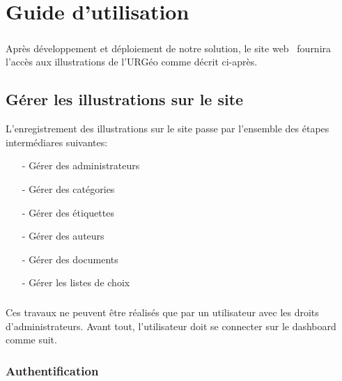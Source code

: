 \chapter{Guide d'utilisation}
	\paragraph{} Apr\`es d\'eveloppement et d\'eploiement de notre solution, le site web \projectName\ fournira l'acc\`es aux illustrations de l'URG\'eo comme d\'ecrit ci-apr\`es. 
	
	\section{G\'erer les illustrations sur le site}
	 L'enregistrement des illustrations sur le site passe par l'ensemble des \'etapes interm\'ediares suivantes:
		 	\begin{itemize}
		 		\item[-] G\'erer des administrateurs
		 		\item[-] G\'erer des cat\'egories
		 		\item[-] G\'erer des \'etiquettes
		 		\item[-] G\'erer des auteurs
		 		\item[-] G\'erer des documents
		 		\item[-] G\'erer les listes de choix
		 	\end{itemize} 
	 	
	 	\paragraph{} Ces travaux ne peuvent \^etre r\'ealis\'es que par un utilisateur avec les droits d'administrateurs. Avant tout, l'utilisateur doit se connecter sur le dashboard comme suit.
	 	
		\subsection{Authentification}
		
